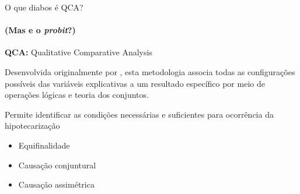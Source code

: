 \begin{frame}{O que diabos é QCA?}
\framesubtitle{(Mas e o \textit{probit}?)}

\textbf{QCA:} Qualitative Comparative Analysis

 Desenvolvida originalmente por \textcite{ragin_comparative_1989}, esta metodologia associa todas as configurações possíveis das variáveis explicativas a um resultado específico por meio de operações lógicas e teoria dos conjuntos.

Permite identificar as condições necessárias e suficientes para ocorrência da hipotecarização

\begin{itemize}
    \item Equifinalidade
    \item Causação conjuntural
    \item Causação assimétrica
\end{itemize}
\end{frame}